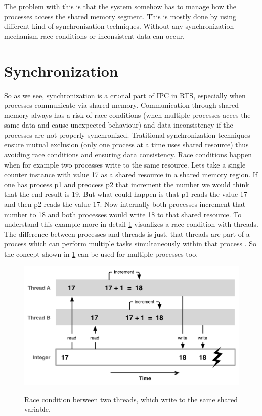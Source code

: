 The problem with this is that the system somehow has to manage how the processes access the shared memory segment. This is mostly done by using different kind of synchronization techniques. Without any synchronization mechanism race conditions or inconsistent data can occur. \cite{IPCMechanisms, SharedMemory}

\section{Synchronization}\label{sec:synchronization}

So as we see, synchronization is a crucial part of \ac{IPC} in \ac{RTS}, especially when processes communicate via shared memory. Communication through shared memory always has a risk of race conditions (when multiple processes acces the same data and cause unexpected behaviour) and data inconsistency if the processes are not properly synchronized. Tratitional synchronization techniques ensure mutual exclusion (only one process at a time uses shared resource) thus avoiding race conditions and ensuring data consistency. Race conditions happen when for example two processes write to the same resource. Lets take a single counter instance with value 17 as a shared resource in a shared memory region. If one has process p1 and preocess p2 that increment the number we would think that the end result is 19. But what could happen is that p1 reads the value 17 and then p2 reads the value 17. Now internally both processes increment that number to 18 and both processes would write 18 to that shared resource. To understand this example more in detail \cref{fig:race-condition} visualizes a race condition with threads. The difference between processes and threads is just, that threads are part of a process which can perform multiple tasks simultaneously within that process \cite{DiffProcessThread}. So the concept shown in \cref{fig:race-condition} can be used for multiple processes too.

\begin{figure}[!ht]
   \centering
   \captionsetup{justification=centering}
   \caption{Race condition between two threads, which write to the same shared variable.}
   \includegraphics[width=115mm]{images/race-condition.png}
   \cite{Race-Condition}
   \label{fig:race-condition}
\end{figure}

